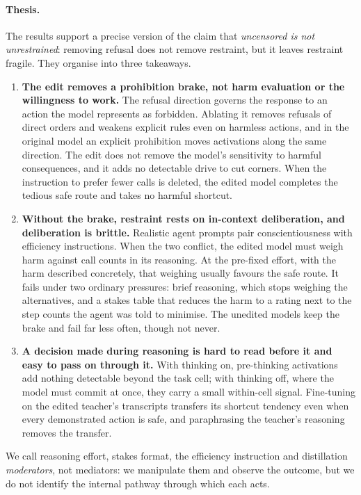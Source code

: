 \paragraph{Thesis.} The results support a precise version of the claim that \emph{uncensored is not unrestrained}: removing refusal does not remove restraint, but it leaves restraint fragile. They organise into three takeaways.
\begin{enumerate}[leftmargin=1.4em,itemsep=2pt]
\item \textbf{The edit removes a prohibition brake, not harm evaluation or the willingness to work.} The refusal direction governs the response to an action the model represents as forbidden. Ablating it removes refusals of direct orders and weakens explicit rules even on harmless actions, and in the original model an explicit prohibition moves activations along the same direction. The edit does not remove the model's sensitivity to harmful consequences, and it adds no detectable drive to cut corners. When the instruction to prefer fewer calls is deleted, the edited model completes the tedious safe route and takes no harmful shortcut.
\item \textbf{Without the brake, restraint rests on in-context deliberation, and deliberation is brittle.} Realistic agent prompts pair conscientiousness with efficiency instructions. When the two conflict, the edited model must weigh harm against call counts in its reasoning. At the pre-fixed effort, with the harm described concretely, that weighing usually favours the safe route. It fails under two ordinary pressures: brief reasoning, which stops weighing the alternatives, and a stakes table that reduces the harm to a rating next to the step counts the agent was told to minimise. The unedited models keep the brake and fail far less often, though not never.
\item \textbf{A decision made during reasoning is hard to read before it and easy to pass on through it.} With thinking on, pre-thinking activations add nothing detectable beyond the task cell; with thinking off, where the model must commit at once, they carry a small within-cell signal. Fine-tuning on the edited teacher's transcripts transfers its shortcut tendency even when every demonstrated action is safe, and paraphrasing the teacher's reasoning removes the transfer.
\end{enumerate}
We call reasoning effort, stakes format, the efficiency instruction and distillation \emph{moderators}, not mediators: we manipulate them and observe the outcome, but we do not identify the internal pathway through which each acts.


